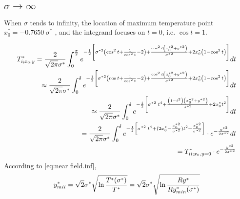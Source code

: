\documentclass[review, 1p, number, sort&compress,table]{elsarticle}
\begin{document}
	\subsection{$\sigma\rightarrow{\infty}$}
	When $\sigma$ tends to infinity, the  location of maximum temperature point $x^{*}_0=-0.7650 \;\sigma^{*}$ , and  the integrand focuses on $t=0$, i.e. $\cos{t}=1$.

		\begin{eqnarray}
		\nonumber 
		T^{*}_{\uppercase\expandafter{\romannumeral1};x_0,y} =\frac{2}{\sqrt{2\pi}\sigma^*}\int_{0}^{\frac{\pi}{2}} e^{-\frac{1}{2}\left[\sigma^{*2}\left(\cos^2{t}+\frac{1}{\cos^2{t}}-2 \right)+\frac{\cos^2{t}\left(x_0^{*2}+y^{*2}\right)}{\sigma^{*2}}+2x_0^{*}\left( 1-\cos^2{t} \right)\right] }dt
		\\ \nonumber
		\approx  \frac{2}{\sqrt{2\pi}\sigma^*}\int_{0}^{\delta} e^{-\frac{1}{2}\left[\sigma^{*2}\left(\cos{t}+\frac{1}{\cos^2{t}}-2 \right)+\frac{\cos^2{t} \left(x_0^{*2}+y^{*2}\right) }{\sigma^{*2}}+2x_0^{*}\left( 1-\cos^2{t} \right)\right] }dt
		\\ \nonumber
		\approx  \frac{2}{\sqrt{2\pi}\sigma^*}\int_{0}^{\delta} e^{-\frac{1}{2}\left[\sigma^{*2}\;t^4+\frac{\left(1-t^2\right)\left(x_0^{*2}+y^{*2}\right) }{\sigma^{*2}}+2x_0^{*}t^2 \right] }dt
		\\ \nonumber		
		= \frac{2}{\sqrt{2\pi}\sigma^*}\int_{0}^{\delta} e^{-\frac{1}{2}\left[\sigma^{*2}\;t^4+(2x_0^{*}-\frac{x_0^{*2}}{\sigma^{*2}})t^2 +\frac{x_0^{*2}}{\sigma^{*2}}\right]}\cdot e^{-\frac{y^{*2}}{2\sigma^{*2}}}dt
		\\ 
		=	 T^{*}_{\uppercase\expandafter{\romannumeral2};x_0,y=0}\cdot
		e^{-\frac{y^{*2}}{2\sigma^{*2}}} \label{eq:near field.inf}
		\end{eqnarray}
		According to \autoref{eq:near field.inf},
		\begin{equation} \label{eq:Sm.inf}
			y_{m\uppercase\expandafter{\romannumeral2}}^{*} = \sqrt{2}\sigma^{*}\sqrt{\ln{\frac{T^{*}(\sigma^{*})}{T^{*}}}}=\sqrt {2}\sigma^{*}\sqrt{\ln{\frac{Ry^{*}}{Ry_{min}^{*}(\sigma^{*})}}}
		\end{equation}
\end{document}
